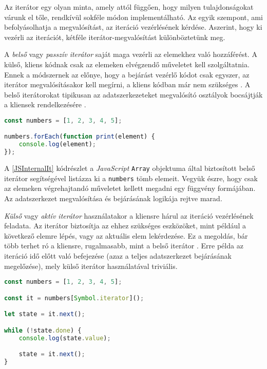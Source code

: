 Az iterátor egy olyan minta, amely attól függően, hogy milyen tulajdonságokat várunk el tőle, rendkívül sokféle módon implementálható. Az egyik szempont, ami befolyásolhatja a megvalósítást, az iteráció vezérlésének kérdése. Aszerint, hogy ki vezérli az iterációt, kétféle iterátor-megvalósítást különböztetünk meg.

A \textit{belső} vagy \textit{passzív iterátor} saját maga vezérli az elemekhez való hozzáférést. A külső, kliens kódnak csak az elemeken elvégzendő műveletet kell szolgáltatnia. Ennek a módszernek az előnye, hogy a bejárást vezérlő kódot csak egyszer, az iterátor megvalósításakor kell megírni, a kliens kódban már nem szükséges \cite{Martin1994}. A belső iterátorokat tipikusan az adatszerkezeteket megvalósító osztályok bocsájtják a kliensek rendelkezésére \cite{Kuhne1999}.

\begin{lstlisting}[language=JavaScript, caption={Tömb elemeinek kilistázása belső iterátorral JavaScriptben}, captionpos=b, label=JSInternalIt]
const numbers = [1, 2, 3, 4, 5];

numbers.forEach(function print(element) {
    console.log(element);
});
\end{lstlisting}

A \ref{JSInternalIt} kódrészlet a \textit{JavaScript} \texttt{Array} objektuma által biztosított belső iterátor segítségével listázza ki a \texttt{numbers} tömb elemeit. Vegyük észre, hogy csak az elemeken végrehajtandó műveletet kellett megadni egy függvény formájában. Az adatszerkezet megvalósítása és bejárásának logikája rejtve marad.

\textit{Külső} vagy \textit{aktív iterátor} használatakor a kliensre hárul az iteráció vezérlésének feladata. Az iterátor biztosítja az ehhez szükséges eszközöket, mint például a következő elemre lépés, vagy az aktuális elem lekérdezése. Ez a megoldás, bár több terhet ró a kliensre, rugalmasabb, mint a belső iterátor . Erre példa az iteráció idő előtt való befejezése (azaz a teljes adatszerkezet bejárásának megelőzése), mely külső iterátor használatával triviális. 

\begin{lstlisting}[language=JavaScript, caption={Tömb elemeinek kilistázása külső iterátorral JavaScriptben}, captionpos=b, label=JSExternalIt]
const numbers = [1, 2, 3, 4, 5];

const it = numbers[Symbol.iterator]();

let state = it.next();

while (!state.done) {
    console.log(state.value);

    state = it.next();
}
\end{lstlisting}

